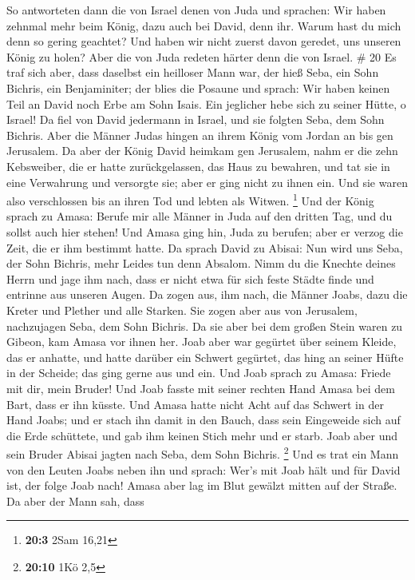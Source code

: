  So antworteten dann die von Israel denen von Juda und
sprachen: Wir haben zehnmal mehr beim König, dazu auch bei David, denn
ihr. Warum hast du mich denn so gering geachtet? Und haben wir nicht
zuerst davon geredet, uns unseren König zu holen? Aber die von Juda
redeten härter denn die von Israel. \# 20  Es traf sich
aber, dass daselbst ein heilloser Mann war, der hieß Seba, ein Sohn
Bichris, ein Benjaminiter; der blies die Posaune und sprach: Wir haben
keinen Teil an David noch Erbe am Sohn Isais. Ein jeglicher hebe sich zu
seiner Hütte, o Israel!  Da fiel von David jedermann in
Israel, und sie folgten Seba, dem Sohn Bichris. Aber die Männer Judas
hingen an ihrem König vom Jordan an bis gen Jerusalem.  Da
aber der König David heimkam gen Jerusalem, nahm er die zehn Kebsweiber,
die er hatte zurückgelassen, das Haus zu bewahren, und tat sie in eine
Verwahrung und versorgte sie; aber er ging nicht zu ihnen ein. Und sie
waren also verschlossen bis an ihren Tod und lebten als Witwen.
\footnote{\textbf{20:3} 2Sam 16,21}  Und der König sprach zu
Amasa: Berufe mir alle Männer in Juda auf den dritten Tag, und du sollst
auch hier stehen!  Und Amasa ging hin, Juda zu berufen; aber
er verzog die Zeit, die er ihm bestimmt hatte.  Da sprach
David zu Abisai: Nun wird uns Seba, der Sohn Bichris, mehr Leides tun
denn Absalom. Nimm du die Knechte deines Herrn und jage ihm nach, dass
er nicht etwa für sich feste Städte finde und entrinne aus unseren
Augen.  Da zogen aus, ihm nach, die Männer Joabs, dazu die
Kreter und Plether und alle Starken. Sie zogen aber aus von Jerusalem,
nachzujagen Seba, dem Sohn Bichris.  Da sie aber bei dem
großen Stein waren zu Gibeon, kam Amasa vor ihnen her. Joab aber war
gegürtet über seinem Kleide, das er anhatte, und hatte darüber ein
Schwert gegürtet, das hing an seiner Hüfte in der Scheide; das ging
gerne aus und ein.  Und Joab sprach zu Amasa: Friede mit
dir, mein Bruder! Und Joab fasste mit seiner rechten Hand Amasa bei dem
Bart, dass er ihn küsste.  Und Amasa hatte nicht Acht auf
das Schwert in der Hand Joabs; und er stach ihn damit in den Bauch, dass
sein Eingeweide sich auf die Erde schüttete, und gab ihm keinen Stich
mehr und er starb. Joab aber und sein Bruder Abisai jagten nach Seba,
dem Sohn Bichris. \footnote{\textbf{20:10} 1Kö 2,5}  Und es
trat ein Mann von den Leuten Joabs neben ihn und sprach: Wer's mit Joab
hält und für David ist, der folge Joab nach!  Amasa aber
lag im Blut gewälzt mitten auf der Straße. Da aber der Mann sah, dass
